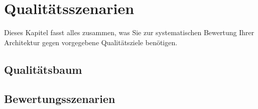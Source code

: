 \section{Qualitätsszenarien}
Dieses Kapitel fasst alles zusammen, was Sie zur systematischen Bewertung Ihrer Architektur gegen vorgegebene Qualitätsziele benötigen. 

\subsection{Qualitätsbaum}
%
%

\subsection{Bewertungsszenarien}


